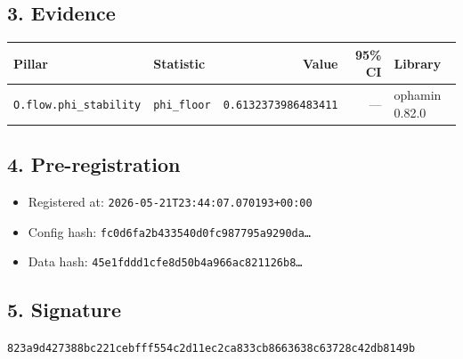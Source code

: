 \documentclass{article}
\begin{document}
\subsection*{3. Evidence}
\begin{tabular}{llrrl}\toprule
\textbf{Pillar} & \textbf{Statistic} & \textbf{Value} & \textbf{95\% CI} & \textbf{Library} \\\midrule
\texttt{O.flow.phi\_stability} & \texttt{phi\_floor} & \texttt{0.6132373986483411} & --- & ophamin 0.82.0 \\
\bottomrule\end{tabular}
\subsection*{4. Pre-registration}
\begin{itemize}
\item Registered at: \texttt{2026-05-21T23:44:07.070193+00:00}
\item Config hash: \texttt{fc0d6fa2b433540d0fc987795a9290da\dots}
\item Data hash: \texttt{45e1fddd1cfe8d50b4a966ac821126b8\dots}
\end{itemize}
\subsection*{5. Signature}
\texttt{823a9d427388bc221cebfff554c2d11ec2ca833cb8663638c63728c42db8149b}\\
\end{document}
